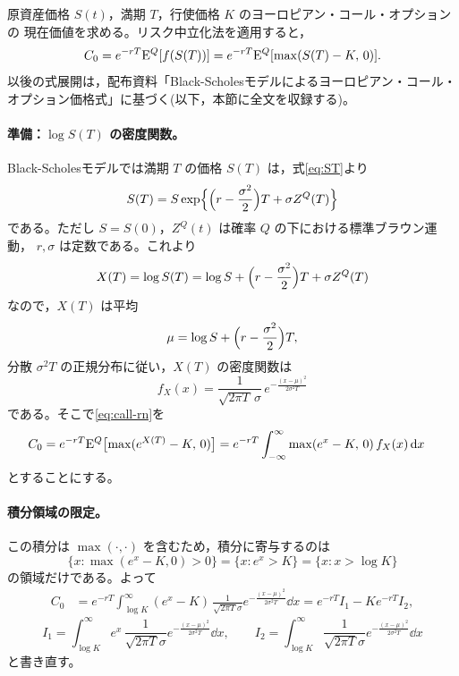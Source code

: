 原資産価格 $S(t)$，満期 $T$，行使価格 $K$ のヨーロピアン・コール・オプションの
現在価値を求める。リスク中立化法を適用すると，
\begin{equation}
C_0 = e^{-rT}\mathrm{E}^Q[f(S(T))] = e^{-rT}\mathrm{E}^Q[\max(S(T)-K,\,0)].
\label{eq:call-rn}
\end{equation}
以後の式展開は，配布資料「Black-Scholesモデルによるヨーロピアン・コール・
オプション価格式」に基づく(以下，本節に全文を収録する)。

\paragraph{準備：$\log S(T)$ の密度関数。}
Black-Scholesモデルでは満期 $T$ の価格 $S(T)$ は，式\eqref{eq:ST}より
\[
S(T) = S\exp\Bigl\{\Bigl(r-\frac{\sigma^2}{2}\Bigr)T + \sigma Z^Q(T)\Bigr\}
\]
である。ただし $S = S(0)$，$Z^Q(t)$ は確率 $Q$ の下における標準ブラウン運動，
$r, \sigma$ は定数である。これより
\[
X(T) = \log S(T) = \log S + \Bigl(r-\frac{\sigma^2}{2}\Bigr)T + \sigma Z^Q(T)
\]
なので，$X(T)$ は平均
\[
\mu = \log S + \Bigl(r - \frac{\sigma^2}{2}\Bigr)T,
\]
分散 $\sigma^2 T$ の正規分布に従い，$X(T)$ の密度関数は
\begin{equation}
f_X(x) = \frac{1}{\sqrt{2\pi T}\,\sigma}\,
e^{-\frac{(x-\mu)^2}{2\sigma^2T}}
\end{equation}
である。そこで\eqref{eq:call-rn}を
\begin{align}
C_0 &= e^{-rT}\mathrm{E}^Q\bigl[\max(e^{X(T)} - K,\,0)\bigr]
= e^{-rT}\int_{-\infty}^{\infty}\max(e^x - K,\,0)\,f_X(x)\,\mathrm{d} x
\end{align}
とすることにする。

\paragraph{積分領域の限定。}
この積分は $\max(\cdot,\cdot)$ を含むため，積分に寄与するのは
\[
\{x : \max(e^x - K, 0) > 0\} = \{x : e^x > K\} = \{x : x > \log K\}
\]
の領域だけである。よって
\begin{align}
C_0 &= e^{-rT}\int_{\log K}^{\infty}(e^x - K)\,
\frac{1}{\sqrt{2\pi T}\sigma}e^{-\frac{(x-\mu)^2}{2\sigma^2T}}\dd x
= e^{-rT}I_1 - Ke^{-rT}I_2,
\label{eq:c0-i1i2}
\end{align}
\begin{equation}
I_1 = \int_{\log K}^{\infty}e^x\,
\frac{1}{\sqrt{2\pi T}\sigma}e^{-\frac{(x-\mu)^2}{2\sigma^2T}}\dd x,
\qquad
I_2 = \int_{\log K}^{\infty}
\frac{1}{\sqrt{2\pi T}\sigma}e^{-\frac{(x-\mu)^2}{2\sigma^2T}}\dd x
\end{equation}
と書き直す。


